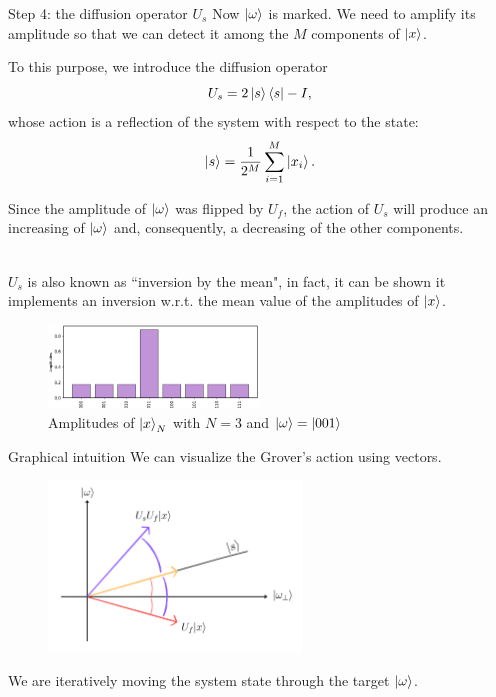 \documentclass[aspectratio=169, 8pt, xcolor={svgnames}, hyperref={linkcolor=black}]{beamer}
\begin{document}
\begin{frame}{Step 4: the diffusion operator $U_s$}
Now $\ket{\omega}$ is marked. We need to amplify its amplitude so that we can 
detect it among the $M$ components of $\ket{x}$. \pause

To this purpose, we introduce the diffusion operator
$$ U_s =  2 \ket{s}\bra{s} - I, $$
whose action is a reflection of the system with respect to the state:
$$ \ket{s} = \frac{1}{2^{M}}\sum_{i=1}^{M} \ket{x_i}. $$ \pause 

Since the amplitude of $\ket{\omega}$ was flipped by $U_f$, the action of $U_s$ 
will produce an increasing of $\ket{\omega}$ and, consequently, a decreasing of the 
other components. \pause

\begin{multicols}{2}
\textit{\\}
$U_s$ is also known as \textcolor{carnelian}{``inversion by the mean"}, in fact, it can be shown 
it implements an inversion w.r.t. the mean value of the amplitudes of $\ket{x}$.
\begin{figure}
   \includegraphics[width=0.5\textwidth]{figures/state3.png}
   \caption*{Amplitudes of $\ket{x}_N$ with $N=3$ and $\ket{\omega} = \ket{001}$}
\end{figure}
\end{multicols}
\end{frame}

\begin{frame}{Graphical intuition}
We can visualize the Grover's action using vectors.
\begin{figure}
   \includegraphics[width=0.6\textwidth]{figures/vectors.png}
\end{figure}
We are iteratively moving the system state through the target $\ket{\omega}$.
\end{frame}
\end{document}
